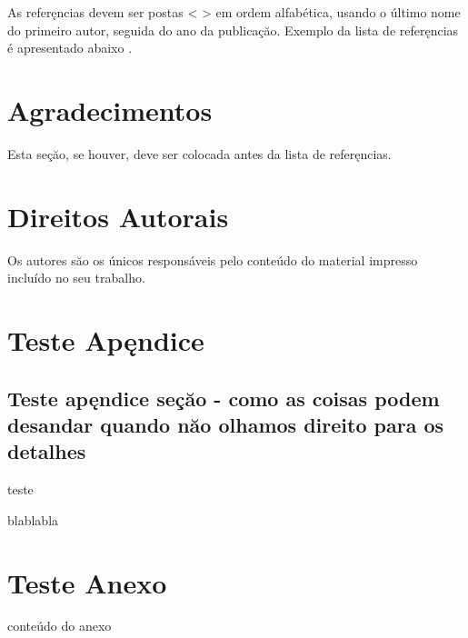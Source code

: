 \documentclass{ufscThesis}
\begin{document}
As referęncias devem ser postas < > em ordem alfabética, usando o último nome do primeiro autor, seguida do ano da publicaçăo. Exemplo da lista de referęncias é apresentado abaixo \cite{Rocha-2010-Teste}.

\chapter{Agradecimentos}
Esta seçăo, se houver, deve ser colocada antes da lista de referęncias.

\chapter{Direitos Autorais}
Os autores săo os únicos responsáveis pelo conteúdo do material impresso incluído no seu trabalho.






\apendice
\chapter{Teste Apęndice}
\section{Teste apęndice seçăo - como as coisas podem desandar quando năo olhamos direito para os detalhes}
teste

blablabla

\anexo
\chapter{Teste Anexo}
conteúdo do anexo
\end{document}
